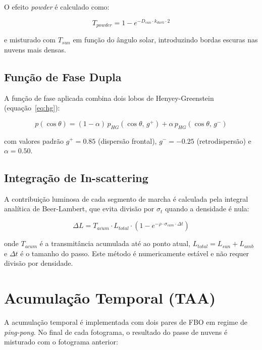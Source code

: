 O efeito \emph{powder} é calculado como:

\begin{equation}
T_{powder} = 1 - e^{-D_{sun} \cdot k_{dark} \cdot 2}
\label{eq:powder}
\end{equation}

e misturado com $T_{sun}$ em função do ângulo solar, introduzindo bordas escuras nas nuvens mais densas.

\subsection{Função de Fase Dupla}
\label{chap4:subsec:phasedouble}

A função de fase aplicada combina dois lobos de Henyey-Greenstein (equação~\ref{eq:hg}):

\begin{equation}
p(\cos\theta) = (1 - \alpha)\, p_{HG}(\cos\theta,\, g^+) + \alpha\, p_{HG}(\cos\theta,\, g^-)
\label{eq:dualphase}
\end{equation}

com valores padrão $g^+ = 0.85$ (dispersão frontal), $g^- = -0.25$ (retrodispersão) e $\alpha = 0.50$.

\subsection{Integração de In-scattering}
\label{chap4:subsec:inscatter}

A contribuição luminosa de cada segmento de marcha é calculada pela integral analítica de Beer-Lambert, que evita divisão por $\sigma_t$ quando a densidade é nula:

\begin{equation}
\Delta L = T_{acum} \cdot L_{total} \cdot (1 - e^{-\rho \cdot \sigma_{cam} \cdot \Delta t})
\label{eq:inscatter}
\end{equation}

onde $T_{acum}$ é a transmitância acumulada até ao ponto atual, $L_{total} = L_{sun} + L_{amb}$ e $\Delta t$ é o tamanho do passo. Este método é numericamente estável e não requer divisão por densidade.

\section{Acumulação Temporal (TAA)}
\label{chap4:sec:taa}

A acumulação temporal é implementada com dois pares de \ac{FBO} em regime de \emph{ping-pong}. No final de cada fotograma, o resultado do passe de nuvens é misturado com o fotograma anterior:

